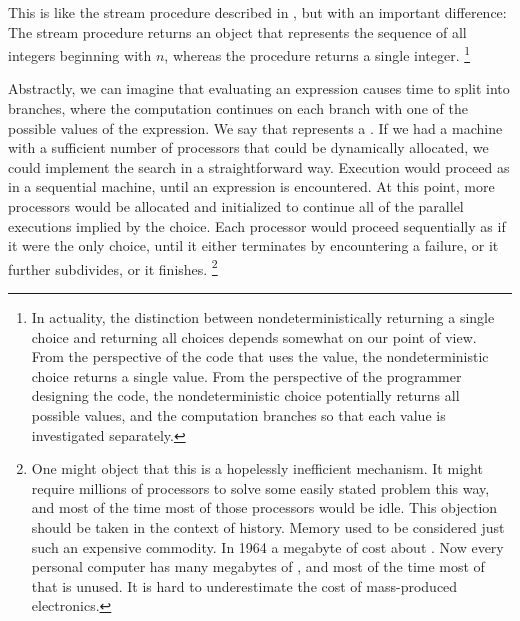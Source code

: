 This is like the stream procedure  described in , but with an important difference:
The stream procedure returns an object that represents the sequence of all integers beginning with \( n \), whereas the  procedure returns a single integer.%
\footnote{
	In actuality, the distinction between nondeterministically returning a single choice and returning all choices depends somewhat on our point of view.
	From the perspective of the code that uses the value, the nondeterministic choice returns a single value.
	From the perspective of the programmer designing the code, the nondeterministic choice potentially returns all possible values, and the computation branches so that each value is investigated separately.
}

Abstractly, we can imagine that evaluating an  expression causes time to split into branches, where the computation continues on each branch with one of the possible values of the expression.
We say that  represents a .
If we had a machine with a sufficient number of processors that could be dynamically allocated, we could implement the search in a straightforward way.
Execution would proceed as in a sequential machine, until an  expression is encountered.
At this point, more processors would be allocated and initialized to continue all of the parallel executions implied by the choice.
Each processor would proceed sequentially as if it were the only choice, until it either terminates by encountering a failure, or it further subdivides, or it finishes.%
\footnote{
	One might object that this is a hopelessly inefficient mechanism.
	It might require millions of processors to solve some easily stated problem this way, and most of the time most of those processors would be idle.
	This objection should be taken in the context of history.
	Memory used to be considered just such an expensive commodity.
	In 1964 a megabyte of  cost about .
	Now every personal computer has many megabytes of , and most of the time most of that  is unused.
	It is hard to underestimate the cost of mass-produced electronics.
}

